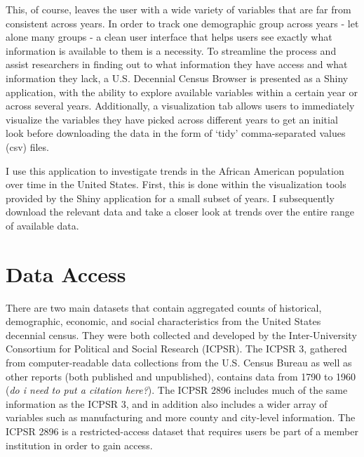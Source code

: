 \documentclass[DIV=calc, paper=a4, fontsize=10pt, twocolumn]{scrartcl}\usepackage[]{graphicx}\usepackage[]{color}
\begin{document}
\par This, of course, leaves the user with a wide variety of variables that are far from consistent across years. In order to track one demographic group across years - let alone many groups - a clean user interface that helps users see exactly what information is available to them is a necessity. To streamline the process and assist researchers in finding out to what information they have access and what information they lack, a U.S. Decennial Census Browser is presented as a Shiny application, with the ability to explore available variables within a certain year or across several years. Additionally, a visualization tab allows users to immediately visualize the variables they have picked across different years to get an initial look before downloading the data in the form of `tidy' comma-separated values (csv) files.  

\par I use this application to investigate trends in the African American population over time in the United States. First, this is done within the visualization tools provided by the Shiny application for a small subset of years. I subsequently download the relevant data and take a closer look at trends over the entire range of available data.  


\section*{Data Access}

\par There are two main datasets that contain aggregated counts of historical, demographic, economic, and social characteristics from the United States decennial census. They were both collected and developed by the Inter-University Consortium for Political and Social Research (ICPSR). The ICPSR 3, gathered from computer-readable data collections from the U.S. Census Bureau as well as other reports (both published and unpublished), contains data from 1790 to 1960 (\textit{do i need to put a citation here?}). The ICPSR 2896 includes much of the same information as the ICPSR 3, and in addition also includes a wider array of variables such as manufacturing and more county and city-level information. The ICPSR 2896 is a restricted-access dataset that requires users be part of a member institution in order to gain access.  
\end{document}
